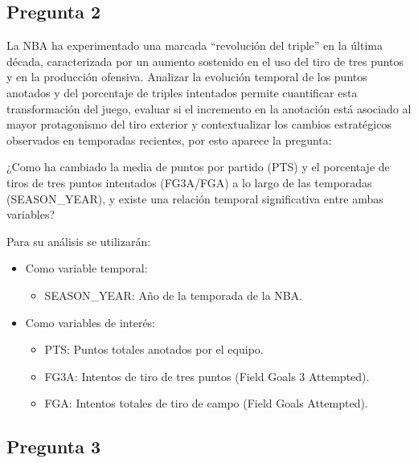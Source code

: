 \documentclass[12pt]{article}
\begin{document}
\subsection*{Pregunta 2}
\label{subsec:pregunta2}

\vspace{0.3cm}

La NBA ha experimentado una marcada ``revolución del triple'' en la última década, caracterizada por un aumento sostenido en el uso del tiro de tres puntos y en la producción ofensiva. Analizar la evolución temporal de los puntos anotados y del porcentaje de triples intentados permite cuantificar esta transformación del juego, evaluar si el incremento en la anotación está asociado al mayor protagonismo del tiro exterior y contextualizar los cambios estratégicos observados en temporadas recientes, por esto aparece la pregunta:

\vspace{0.3cm}

¿Como ha cambiado la media de puntos por partido (PTS) y el porcentaje de tiros de tres puntos intentados (FG3A/FGA) a lo largo de las temporadas (SEASON\_YEAR), y existe una relación temporal significativa entre ambas variables?

\vspace{0.3cm}

Para su análisis se utilizarán:
\begin{itemize}[label={}]
    \setlength\itemsep{0.1em}
    \item Como variable temporal:
    \begin{itemize}[label={}]
        \item SEASON\_YEAR: Año de la temporada de la NBA.
    \end{itemize}
    \item Como variables de interés:
    \begin{itemize}[label={}]
        \item PTS: Puntos totales anotados por el equipo.
        \item FG3A: Intentos de tiro de tres puntos (Field Goals 3 Attempted).
        \item FGA: Intentos totales de tiro de campo (Field Goals Attempted).
    \end{itemize}
\end{itemize}

\subsection*{Pregunta 3}
\label{subsec:pregunta3}
\end{document}

